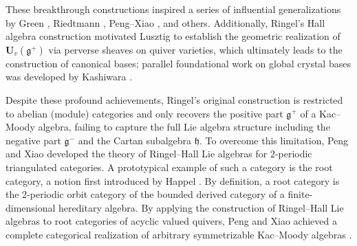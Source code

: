 \documentclass[12pt,reqno]{amsart}
\numberwithin{equation}{section}
\begin{document}
	These breakthrough constructions inspired a series of influential generalizations by Green \cite{Gre95}, Riedtmann \cite{Rie94}, Peng--Xiao \cite{PX97-Root-cat-simple-Lie,PX00-Tri-Cat-Kac}, and others. Additionally, Ringel's Hall algebra construction motivated Lusztig \cite{Lus90,Lus91} to establish the geometric realization of $\mathbf{U}_v(\mathfrak{g}^+)$ via perverse sheaves on quiver varieties, which ultimately leads to the construction of canonical bases; parallel foundational work on global crystal bases was developed by Kashiwara \cite{Kas93}. 
	
	
	Despite these profound achievements, Ringel’s original
	construction is restricted to abelian (module) categories and only recovers the positive part $\mathfrak{g}^+$ of a Kac--Moody algebra, failing to capture the full Lie algebra structure including the negative part $\mathfrak{g}^-$ and the Cartan subalgebra $\mathfrak{h}$. 
	To overcome this limitation, Peng and Xiao \cite{PX97-Root-cat-simple-Lie,PX00-Tri-Cat-Kac} developed the theory of Ringel--Hall Lie algebras for $2$-periodic triangulated categories. A prototypical example of such a category is the root category, a notion first introduced by Happel \cite{H87-der-cat-fd-alg}. By definition, a root category is the $2$-periodic orbit category of the bounded derived category of a finite-dimensional hereditary algebra. By applying the construction of Ringel--Hall Lie algebras to root categories of acyclic valued quivers, Peng and Xiao achieved a complete categorical realization of arbitrary symmetrizable Kac--Moody algebras \cite{PX00-Tri-Cat-Kac}.
	
\end{document}
